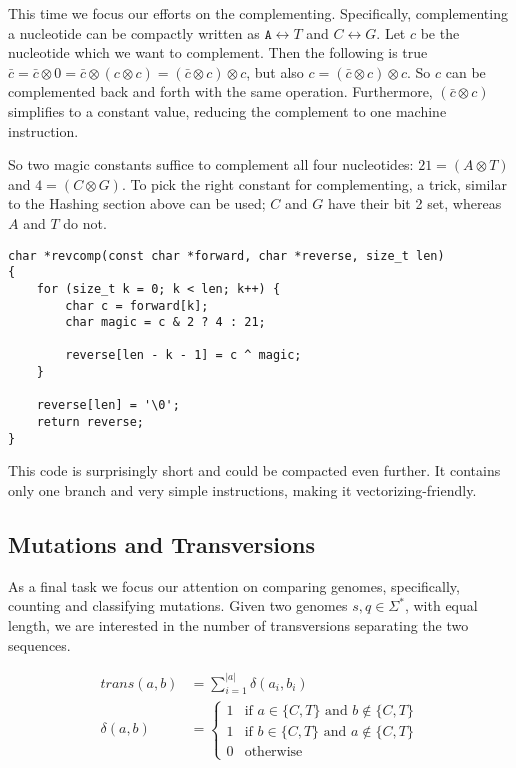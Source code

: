 \documentclass[10pt,letterpaper]{article}
\begin{document}
This time we focus our efforts on the complementing. Specifically, complementing a nucleotide can be compactly written as $\texttt{A} \leftrightarrow T$ and $C \leftrightarrow G$. Let $c$ be the nucleotide which we want to complement. Then the following is true $\bar c = \bar c \otimes 0 = \bar c \otimes (c \otimes c) = (\bar c \otimes c) \otimes c$, but also $c = (\bar c \otimes c) \otimes c$. So $c$ can be complemented back and forth with the same operation. Furthermore, $(\bar c \otimes c)$ simplifies to a constant value, reducing the complement to one machine instruction.

So two magic constants suffice to complement all four nucleotides: $21 = (A \otimes T)$ and $4 = (C \otimes G)$. To pick the right constant for complementing, a trick, similar to the Hashing section above can be used; $C$ and $G$ have their bit 2 set, whereas $A$ and $T$ do not.


\begin{lstlisting}
char *revcomp(const char *forward, char *reverse, size_t len)
{
	for (size_t k = 0; k < len; k++) {
		char c = forward[k];
		char magic = c & 2 ? 4 : 21;

		reverse[len - k - 1] = c ^ magic;
	}

	reverse[len] = '\0';
	return reverse;
}
\end{lstlisting}

This code is surprisingly short and could be compacted even further. It contains only one branch and very simple instructions, making it vectorizing-friendly.


\subsection*{Mutations and Transversions}

As a final task we focus our attention on comparing genomes, specifically, counting and classifying mutations. Given two genomes $s,q \in \Sigma^*$, with equal length, we are interested in the number of transversions separating the two sequences.

\begin{align*}
    \mathit{trans}(a,b) &= \sum_{i=1}^{|a|} \delta(a_i,b_i) \\
    \delta(a,b) &= \begin{cases}
        1 & \text{if } a \in \{C,T\} \text{ and } b \not\in \{C,T\} \\
        1 & \text{if } b \in \{C,T\} \text{ and } a \not\in \{C,T\} \\
        0 & \text{otherwise}
    \end{cases}
\end{align*}
\end{document}
